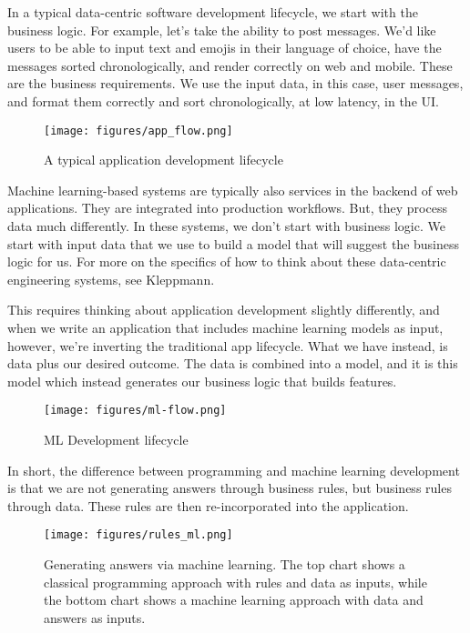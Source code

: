 \documentclass[11pt, table]{diazessay} %
\begin{document}
\begin{sloppypar}
In a  typical data-centric software development lifecycle, we start with the business logic. For example, let's take the ability to post messages. We'd like users to be able to input text and emojis in their language of choice, have the messages sorted chronologically, and render correctly on web and mobile. These are the business requirements. We use the input data, in this case, user messages, and format them correctly and sort chronologically, at low latency, in the UI.

\begin{figure}[H]
\centering
\texttt{[image: figures/app\_flow.png]}
\caption{A typical application development lifecycle}
\end{figure}

Machine learning-based systems are typically also services in the backend of web applications. They are integrated into production workflows. But, they process data much differently. In these systems, we don't start with business logic. We start with input data that we use to build a model that will suggest the business logic for us. For more on the specifics of how to think about these data-centric engineering systems, see Kleppmann\cite{kleppmann2017designing}.

This requires thinking about application development slightly differently, and when we write an application that includes machine learning models as input, however, we’re inverting the traditional app lifecycle. What we have instead, is data plus our desired outcome. The data is combined into a model, and it is this model which instead generates our business logic that builds features.

\begin{figure}[H]
\centering
\texttt{[image: figures/ml-flow.png]}
\caption{ML Development lifecycle}
\end{figure}

In short, the difference between programming and machine learning development is that we are not generating answers through business rules, but business rules through data. These rules are then re-incorporated into the application.

\begin{figure}[H]
\centering
\texttt{[image: figures/rules\_ml.png]}
\caption{Generating answers via machine learning. The top chart shows a classical programming approach with rules and data as inputs, while the bottom chart shows a machine learning approach with data and answers as inputs.  \citep{chollet2021deep}}
\end{figure}


\end{sloppypar}
\end{document}
